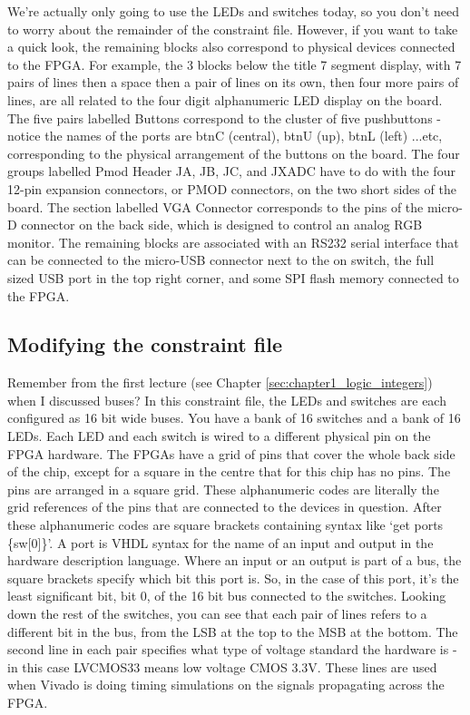 \documentclass[../physical_computing.tex]{subfiles}
\begin{document}
We're actually only going to use the LEDs and switches today, so you don't need to worry about the remainder of the constraint file. However, if you want to take a quick look, the remaining blocks also correspond to physical devices connected to the FPGA. For example, the 3 blocks below the title 7 segment display, with 7 pairs of lines then a space then a pair of lines on its own, then four more pairs of lines, are all related to the four digit alphanumeric LED display on the board. The five pairs labelled Buttons correspond to the cluster of five pushbuttons - notice the names of the ports are btnC (central), btnU (up), btnL (left) ...etc, corresponding to the physical arrangement of the buttons on the board. The four groups labelled Pmod Header JA, JB, JC, and JXADC have to do with the four 12-pin expansion connectors, or PMOD connectors, on the two short sides of the board. The section labelled VGA Connector corresponds to the pins of the micro-D connector on the back side, which is designed to control an analog RGB monitor. The remaining blocks are associated with an RS232 serial interface that can be connected to the micro-USB connector next to the on switch, the full sized USB port in the top right corner, and some SPI flash memory connected to the FPGA.

\subsection{Modifying the constraint file}
\label{sec:constraints}

Remember from the first lecture (see Chapter \ref{sec:chapter1_logic_integers}) when I discussed buses? In this constraint file, the LEDs and switches are each configured as 16 bit wide buses. You have a bank of 16 switches and a bank of 16 LEDs. Each LED and each switch is wired to a different physical pin on the FPGA hardware. The FPGAs have a grid of pins that cover the whole back side of the chip, except for a square in the centre that for this chip has no pins. The pins are arranged in a square grid. These alphanumeric codes are literally the grid references of the pins that are connected to the devices in question. After these alphanumeric codes are square brackets containing syntax like `get ports \{sw[0]\}'. A port is VHDL syntax for the name of an input and output in the hardware description language. Where an input or an output is part of a bus, the square brackets specify which bit this port is. So, in the case of this port, it's the least significant bit, bit 0, of the 16 bit bus connected to the switches. Looking down the rest of the switches, you can see that each pair of lines refers to a different bit in the bus, from the LSB at the top to the MSB at the bottom. The second line in each pair specifies what type of voltage standard the hardware is - in this case LVCMOS33 means low voltage CMOS 3.3V. These lines are used when Vivado is doing timing simulations on the signals propagating across the FPGA. 
\end{document}

